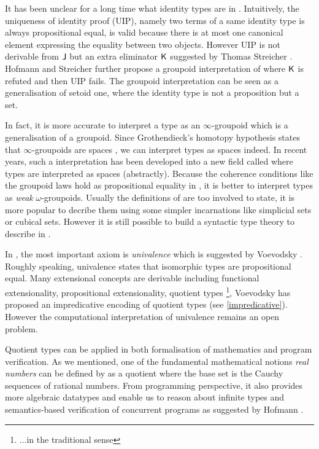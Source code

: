 It has been unclear for a long time what identity types are in \itt. Intuitively, the uniqueness of identity proof (UIP), namely two terms of a same identity type is always propositional equal, is valid because there is at most one canonical element expressing the equality between two objects. However UIP is not derivable from $\operatorname{\mathsf{J}}$ but an extra eliminator $\operatorname{\mathsf{K}}$ suggested by Thomas Streicher \cite{streicherinvestigations}.
Hofmann and Streicher further \cite{MR1686862} propose a groupoid interpretation of \itt where $\operatorname{\mathsf{K}}$ is refuted and then UIP fails. The groupoid interpretation  can be seen as a generalisation of setoid one, where the identity type is not a proposition but a set. 

In fact, it is more accurate to interpret a type as an $\infty$-groupoid which is a generalisation of a groupoid. Since Grothendieck's homotopy hypothesis states that $\infty$-groupoids are spaces \cite{homotopyhyp}, we can interpret types as spaces indeed. In recent years, such a interpretation has been developed into a new field called \hott where types are interpreted as spaces (abstractly).
Because the coherence conditions like the groupoid laws hold as propositional equality in \itt, it is better to interpret types as \emph{weak} $\omega$-groupoids. Usually the definitions of \wog are too involved to state, it is more popular to decribe them using some simpler incarnations  like simplicial sets or cubical sets. However it is still possible to build a syntactic type theory to describe \wog in \itt.

In \hott, the most important axiom is \emph{univalence} which is suggested by Voevodsky \cite{VV}. Roughly speaking, univalence states that isomorphic types are propositional equal. Many extensional concepts are derivable including functional extensionality, propositional extensionality, quotient types \footnote{...in the traditional sense}, Voevodsky has proposed an impredicative encoding of quotient types (see \autoref{impredicative}). However the computational interpretation of univalence remains an open problem.


Quotient types can be applied in both formalisation of mathematics and program verification. As we mentioned, one of the fundamental mathematical notions \emph{real numbers} can be defined by as a quotient where the base set is the Cauchy sequences of rational numbers. 
From programming perspective,  it also provides more algebraic
datatypes and enable us to reason about infinite types and
semantics-based verification of concurrent programs as suggested by Hofmann \cite{hof:phd}.


